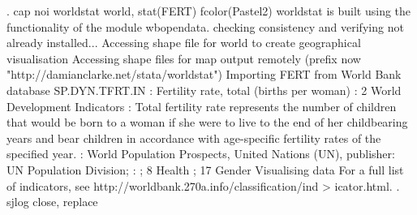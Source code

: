 .     cap noi worldstat world, stat(FERT) fcolor(Pastel2)
worldstat is built using the functionality of the module wbopendata.
checking {} consistency and verifying not already installed...
Accessing shape file for world to create geographical visualisation
Accessing shape files for map output remotely
(prefix now "http://damianclarke.net/stata/worldstat")
Importing FERT from World Bank database
{\smallskip}
    {} SP.DYN.TFRT.IN
    {}: Fertility rate, total (births per woman)
    {}: 2 World Development Indicators
    {}: Total fertility rate represents the number of children that
    would be born to a woman if she were to live to the end of her
    childbearing years and bear children in accordance with age-specific
    fertility rates of the specified year.
    {}: World Population Prospects, United Nations (UN), publisher: UN
    Population Division;
    {}{}{\bftt{)}}:  ; 8 Health ; 17 Gender
{\smallskip}
{\smallskip}
Visualising data
{\smallskip}
{\smallskip}
{\smallskip}
For a full list of indicators, see http://worldbank.270a.info/classification/ind
> icator.html.
.     sjlog close, replace
{\smallskip}
